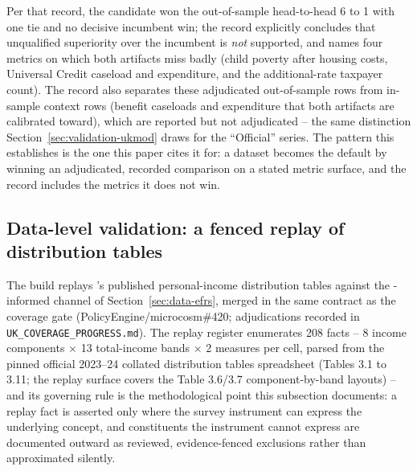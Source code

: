 Per that record, the candidate won the out-of-sample head-to-head 6 to 1
with one tie and no decisive incumbent win; the record explicitly
concludes that unqualified superiority over the incumbent is \emph{not}
supported, and names four metrics on which both artifacts miss badly
(child poverty after housing costs, Universal Credit caseload and
expenditure, and the additional-rate taxpayer count). The record also
separates these adjudicated out-of-sample rows from in-sample context rows
(benefit caseloads and expenditure that both artifacts are calibrated
toward), which are reported but not adjudicated -- the same distinction
Section~\ref{sec:validation-ukmod} draws for the ``Official'' series. The
pattern this establishes is the one this paper cites it for: a dataset
becomes the default by winning an adjudicated, recorded comparison on a
stated metric surface, and the record includes the metrics it does not
win. 

\subsection{Data-level validation: a fenced replay of \hmrc{} distribution
tables}
\label{sec:validation-hmrc-replay}

The \microcosm{} build replays \hmrc{}'s published personal-income
distribution tables against the \spi{}-informed channel of
Section~\ref{sec:data-efrs}, merged in the same contract as the coverage
gate (PolicyEngine/microcosm\#420; adjudications recorded in
\texttt{UK\_COVERAGE\_PROGRESS.md}). The replay register enumerates 208
facts -- 8 income components $\times$ 13 total-income bands $\times$ 2
measures per cell, parsed from the pinned official 2023--24 collated
distribution tables spreadsheet (Tables 3.1 to 3.11; the replay surface
covers the Table 3.6/3.7 component-by-band layouts) -- and its governing
rule is the methodological point this subsection documents: a replay fact
is asserted only where the survey instrument can express the underlying
concept, and constituents the instrument cannot express are documented
outward as reviewed, evidence-fenced exclusions rather than approximated
silently.

